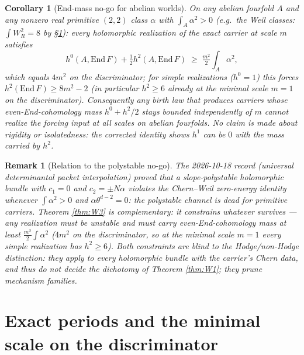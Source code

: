 \documentclass[11pt]{article}
\newtheorem{corollary}{Corollary}
\newtheorem{remark}{Remark}
\begin{document}
\begin{corollary}[End-mass no-go for abelian worlds]\label{cor:rigidity}
On any abelian fourfold $A$ and any nonzero real primitive $(2,2)$ class $\alpha$ with $\int_A\alpha^2>0$
(e.g.\ the Weil classes: $\int W_R^2=8$ by \S\ref{sec:periods}): every holomorphic realization of the exact
carrier at scale $m$ satisfies
\[
h^0(A,\mathrm{End}\,F)+\tfrac12 h^2(A,\mathrm{End}\,F)\;\ge\;\tfrac{m^2}{2}\int_A\alpha^2,
\]
which equals $4m^2$ on the discriminator; for \emph{simple} realizations ($h^0=1$) this forces
$h^2(\mathrm{End}\,F)\ge 8m^2-2$ (in particular $h^2\ge6$ already at the minimal scale $m=1$ on the
discriminator). Consequently \emph{any} birth law that produces carriers whose even-End-cohomology mass
$h^0+h^2/2$ stays bounded independently of $m$ cannot realize the forcing input at all scales on abelian
fourfolds. No claim is made about rigidity or isolatedness: the corrected identity shows $h^1$ can be $0$ with
the mass carried by $h^2$.
\end{corollary}

\begin{remark}[Relation to the polystable no-go]
The 2026-10-18 record (universal determinantal packet interpolation) proved that a slope-polystable holomorphic
bundle with $c_1=0$ and $c_2=\pm N\alpha$ violates the Chern--Weil zero-energy identity whenever
$\int\alpha^2>0$ and $\alpha\theta^{d-2}=0$: the polystable channel is dead for primitive carriers. Theorem
\ref{thm:W3} is complementary: it constrains whatever \emph{survives} --- any realization must be unstable and
must carry even-End-cohomology mass at least $\tfrac{m^2}{2}\int\alpha^2$ ($4m^2$ on the discriminator, so at
the minimal scale $m=1$ every simple realization has $h^2\ge6$). Both constraints are blind to the
Hodge/non-Hodge distinction: they apply to every holomorphic bundle
with the carrier's Chern data, and thus do not decide the dichotomy of Theorem \ref{thm:W1}; they prune mechanism
families.
\end{remark}

\section{Exact periods and the minimal scale on the discriminator}\label{sec:periods}
\end{document}
